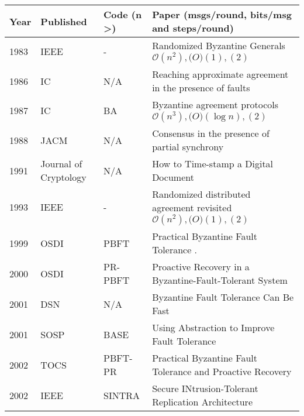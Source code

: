 \documentclass{article}
\begin{document}
\begin{landscape}
\begin{longtable}[c]{llll}
\hline
Year & Published         & Code (n >)          & Paper (msgs/round, bits/msg and steps/round)                                                                                \\ \hline
\endfirsthead
%
\endhead
%
\hline
\endfoot
%
\endlastfoot
%
1983 & IEEE              & -           & Randomized Byzantine Generals $\mathcal{O}(n^2),\mathcal(O)(1),(2)$ \cite{Rabin:1983:RBG:1382437.1382847}    \\
1986 & IC             & N/A         & Reaching approximate agreement in the presence of faults  \cite{Dolev:1986:RAA:5925.5931}    \\
1987 & IC             & BA          & Byzantine agreement protocols $\mathcal{O}(n^3),\mathcal(O)(\log{}n),(2)$ \cite{Bracha:1987:ABA:36888.36891}    \\
1988 & JACM             & N/A         & Consensus in the presence of partial synchrony \cite{}    \\
1991 & Journal of Cryptology             & N/A           & How to Time-stamp a Digital Document   \\
1993 & IEEE              & -           & Randomized distributed agreement revisited $\mathcal{O}(n^2),\mathcal(O)(1),(2)$ \cite{}    \\
1999 & OSDI              & PBFT           & Practical Byzantine Fault Tolerance     \cite{Castro:1999:PBF:296806.296824}.                                                  \\
2000 & OSDI              & PR-PBFT        & Proactive Recovery in a Byzantine-Fault-Tolerant System   \cite{Castro:2000:PRB:1251229.1251248}                                \\
2001 & DSN               & N/A            & Byzantine Fault Tolerance Can Be Fast    \cite{castro01byzantine}                                                  \\
2001 & SOSP              & BASE           & Using Abstraction to Improve Fault Tolerance \cite{article}                                             \\
2002 & TOCS              & PBFT-PR        & Practical Byzantine Fault Tolerance and Proactive Recovery                                \\
2002 & IEEE             & SINTRA        &   Secure INtrusion-Tolerant Replication Architecture     \cite{1028897S}                        \\

\end{longtable}
\end{landscape}
\end{document}
